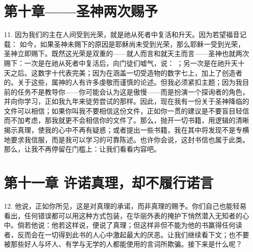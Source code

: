 \section{第十章——圣神两次赐予}

11. 因为我们的主在人间受到光荣，就是祂从死者中复活和升天。因为若望福音记载：  如今，如果圣神未赐下的原因是耶稣尚未受到光荣，那么耶稣一受到光荣，圣神立即赐下。既然这光荣是双重的——就人而言和就天主而言——圣神也就两次赐下：一次是在祂从死者中复活后，向门徒们嘘气，说： ；另一次是在祂升天十天之后。这数字十代表完美；因为在涵盖一切受造物的数字七上，加上了创造者的。关于这些，属神的人有许多虔敬而谨慎的论述。但我必须紧扣主题；因为我目前的任务不是教导你——你可能会认为这是傲慢——而是扮演一个探询者的角色，并向你学习，正如我九年来徒劳尝试的那样。因此，现在我有一份关于圣神降临的文件可以相信；如果你叫我不要相信这份文件，正如你一贯的建议是不要盲目轻信而不加考虑，那我就更不会相信你的文件了。那么，抛开一切书籍，用逻辑的清晰揭示真理，使我的心中不再有疑惑；或者提出一些书籍，我在其中将发现不是专横地要求我信服，而是我可以学习的可靠陈述。也许你会说，这封书信也属于此类。那么，让我不再停留在门槛上：让我们看看内容吧。\par


\section{第十一章  许诺真理，却不履行诺言}

12. 他说，正如你所见，这是对真理的承诺，而非真理的赐予。你们自己也能轻易看出，任何错误都可以用这种方式包装，在华丽外表的掩护下悄然潜入无知者的心中。倘若他说：他若这样说，便说了真理；但这样非但不能为他的书赢得任何读者，反而会在一切得到此书的人心中激起最大的厌恶。让我们继续看下文；也不要被那些好人与坏人、有学与无学的人都能使用的言词所欺骗。接下来是什么呢？\par

